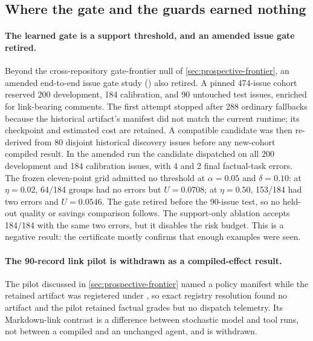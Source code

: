 \subsection{Where the gate and the guards earned nothing}
\label{sec:later-gate}

\paragraph{The learned gate is a support threshold, and an amended issue gate retired.}
Beyond the cross-repository gate-frontier null of \cref{sec:prospective-frontier}, an
amended end-to-end issue gate study
() also retired. A
pinned 474-issue cohort reserved 200 development, 184 calibration, and 90 untouched test
issues, enriched for link-bearing comments. The first attempt stopped after 288 ordinary
fallbacks because the historical artifact's manifest did not match the current runtime;
its checkpoint and estimated cost are retained. A compatible candidate was then re-derived
from 80 disjoint historical discovery issues before any new-cohort compiled result. In the
amended run the candidate dispatched on all 200 development and 184 calibration issues,
with 4 and 2 final factual-task errors. The frozen eleven-point grid admitted no threshold
at $\alpha=0.05$ and $\delta=0.10$: at $\eta=0.02$, 64/184 groups had no errors but
$U=0.0708$; at $\eta=0.50$, 153/184 had two errors and $U=0.0546$. The gate retired before
the 90-issue test, so no held-out quality or savings comparison follows. The support-only
ablation accepts 184/184 with the same two errors, but it disables the risk budget. This is
a negative result: the certificate mostly confirms that enough examples were seen.

\paragraph{The 90-record link pilot is withdrawn as a compiled-effect result.}
The pilot discussed in \cref{sec:prospective-frontier} named a  policy
manifest while the retained artifact was registered under , so exact registry
resolution found no artifact and the pilot retained factual grades but no dispatch
telemetry. Its Markdown-link contrast is a difference between stochastic model and tool
runs, not between a compiled and an unchanged agent, and is withdrawn.

